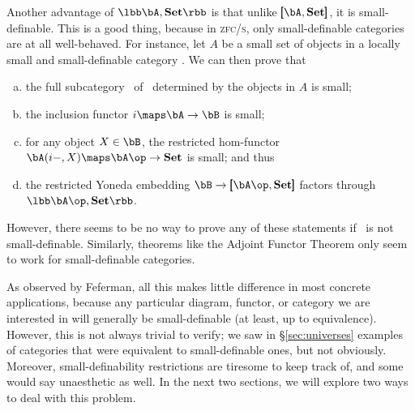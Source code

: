 \documentclass[12pt]{amsart}
\newcommand{\Set}{\ensuremath{\mathbf{Set}}}
\def\zfcs{\textsc{zfc/s}}
\begin{document}
Another advantage of $\lbb\bA,\Set\rbb$ is that unlike
$\pmb[\bA,\Set\pmb]$, it is small-definable.  This is a good thing,
because in \zfcs, only small-definable categories are at all
well-behaved.  For instance, let $A$ be a small set of objects in a
locally small and small-definable category \bB.  We can then prove
that
\begin{enumerate}[(a)]
\item the full subcategory \bA\ of \bB\ determined by the objects in
  $A$ is small;
\item the inclusion functor $i\maps \bA\to\bB$ is small;
\item for any object $X\in \bB$, the restricted hom-functor
  $\bA(i-,X)\maps \bA\op\to\Set$ is small; and thus
\item the restricted Yoneda embedding $\bB\to \pmb[\bA\op,\Set\pmb]$
  factors through $\lbb\bA\op,\Set\rbb$.
\end{enumerate}
However, there seems to be no way to prove any of these statements if
\bB\ is not small-definable.  Similarly, theorems like the Adjoint
Functor Theorem only seem to work for small-definable categories.

As observed by Feferman, all this makes little difference in most
concrete applications, because any particular diagram, functor, or
category we are interested in will generally be small-definable (at
least, up to equivalence).  However, this is not always trivial to
verify; we saw in \S\ref{sec:universes} examples of categories that
were equivalent to small-definable ones, but not obviously.  Moreover,
small-definability restrictions are tiresome to keep track of, and
some would say unaesthetic as well.  In the next two sections, we will
explore two ways to deal with this problem.




\end{document}
